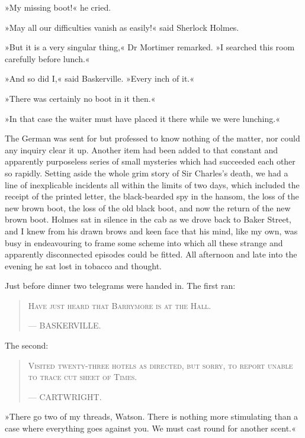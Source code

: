 »My missing boot!« he cried.

»May all our difficulties vanish as easily!« said Sherlock Holmes.

»But it is a very singular thing,« Dr Mortimer remarked. »I searched this room carefully before lunch.«

»And so did I,« said Baskerville. »Every inch of it.«

»There was certainly no boot in it then.«

»In that case the waiter must have placed it there while we were lunching.«

The German was sent for but professed to know nothing of the matter, nor could any inquiry clear it up. Another item had been added to that constant and apparently purposeless series of small mysteries which had succeeded each other so rapidly. Setting aside the whole grim story of Sir Charles's death, we had a line of inexplicable incidents all within the limits of two days, which included the receipt of the printed letter, the black-bearded spy in the hansom, the loss of the new brown boot, the loss of the old black boot, and now the return of the new brown boot. Holmes sat in silence in the cab as we drove back to Baker Street, and I knew from his drawn brows and keen face that his mind, like my own, was busy in endeavouring to frame some scheme into which all these strange and apparently disconnected episodes could be fitted. All afternoon and late into the evening he sat lost in tobacco and thought.

Just before dinner two telegrams were handed in. The first ran:
\begin{samepage}
\blockquote{
\textsc{Have just heard that Barrymore is at the Hall.}
\begin{flushright}
— {\small\scshape BASKERVILLE.}
\end{flushright} 
}
\end{samepage}

The second:
\begin{samepage}
\blockquote{
\textsc{Visited twenty-three hotels as directed, but sorry, to report unable to trace cut sheet of Times.}
\begin{flushright}
— {\small\scshape CARTWRIGHT.}
\end{flushright}
}
\end{samepage}

»There go two of my threads, Watson. There is nothing more stimulating than a case where everything goes against you. We must cast round for another scent.«

